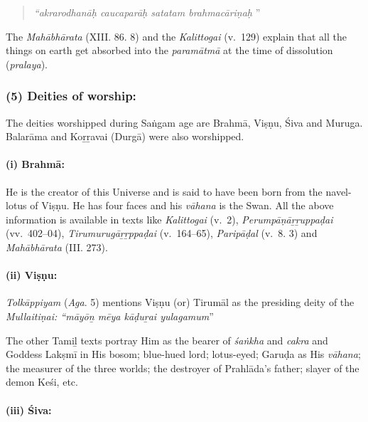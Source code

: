 \begin{quote}
\textit{“akrarodhanāḥ caucaparāḥ satatam brahmacāriṇaḥ }”
\end{quote}

The \textit{Mahābhārata} (XIII. 86. 8) and the \textit{Kalittogai} (v.~129) explain that all the things on earth get absorbed into the \textit{paramātmā} at the time of dissolution (\textit{pralaya}).


\subsubsection*{(5) Deities of worship:}

\vskip -7pt

The deities worshipped during Saṅgam age are Brahmā, Viṣṇu, Śiva and Muruga. Balarāma and Koṟṟavai (Durgā) were also worshipped.

\paragraph*{(i) Brahmā:}

\vskip -7.5pt

He is the creator of this Universe and is said to have been born from the navel-lotus of Viṣṇu. He has four faces and his \textit{vāhana} is the Swan. All the above information is available in texts like \textit{Kalittogai} (v.~2), \textit{Perumpāṇāṟṟuppaḍai} (vv.~402–04), \textit{Tirumurugāṟṟppaḍai} (v.~164–65), \textit{Paripāḍal} (v.~8. 3) and \textit{Mahābhārata} (III. 273).


\paragraph*{(ii) Viṣṇu:}

\vskip -7.5pt

\textit{Tolkāppiyam} (\textit{Aga}. 5) mentions Viṣṇu (or) Tirumāl as the presiding deity of the \textit{Mullaitiṇai: “māyōṉ mēya kāḍuṟai yulagamum}”

The other Tamiḻ texts portray Him as the bearer of \textit{śaṅkha} and \textit{cakra} and Goddess Lakṣmī in His bosom; blue-hued lord; lotus-eyed; Garuḍa as His \textit{vāhana}; the measurer of the three worlds; the destroyer of Prahlāda’s father; slayer of the demon Keśi, etc.


\paragraph*{(iii) Śiva:}

